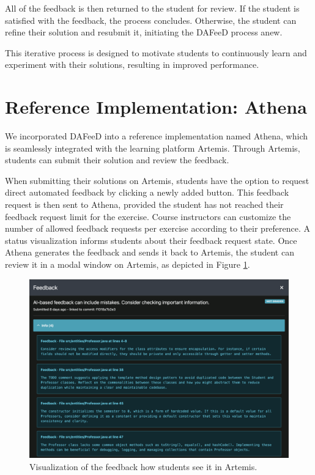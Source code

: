 \documentclass[manuscript,screen,review]{acmart}
\begin{document}
All of the feedback is then returned to the student for review.
If the student is satisfied with the feedback, the process concludes. 
Otherwise, the student can refine their solution and resubmit it, initiating the DAFeeD process anew.

This iterative process is designed to motivate students to continuously learn and experiment with their solutions, resulting in improved performance.


\section{Reference Implementation: Athena} %
\label{sec:reference-implementation}

We incorporated DAFeeD into a reference implementation named Athena, which is seamlessly integrated with the learning platform Artemis. 
Through Artemis, students can submit their solution and review the feedback.

When submitting their solutions on Artemis, students have the option to request direct automated feedback by clicking a newly added button.
This feedback request is then sent to Athena, provided the student has not reached their feedback request limit for the exercise.
Course instructors can customize the number of allowed feedback requests per exercise according to their preference.
A status visualization informs students about their feedback request state.
Once Athena generates the feedback and sends it back to Artemis, the student can review it in a modal window on Artemis, as depicted in Figure \ref{fig:Artemis-feedback-visualization}.

\begin{figure}[htbp]
  \centering
  \includegraphics[width=0.9\linewidth]{figures/artemis-feedback_anonymized.png}
  \caption{Visualization of the feedback how students see it in Artemis.}
  \label{fig:Artemis-feedback-visualization}
\end{figure}
\end{document}
